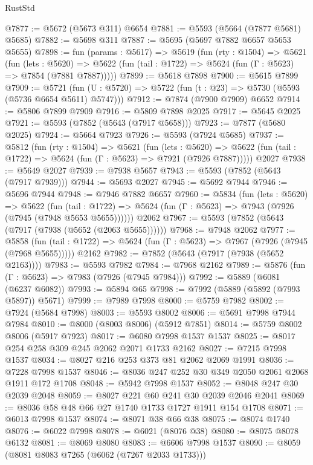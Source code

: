 \begin{lexlean}{RustStd}
\begin{coremodule}
@7877 := @5672 (@5673 @311) @6654
@7881 := @5593 (@5664 (@7877 @5681) @5685)
@7882 := @5698 @311
@7887 := @5695 (@5697 @7882 @6657 @5653 @5655)
@7898 := fun (params : @5617) =>
  @5619
    (fun (rty : @1504) =>
    @5621
      (fun (lets : @5620) =>
      @5622 (fun (tail : @1722) => @5624 (fun (Γ : @5623) => @7854 (@7881 @7887)))))
@7899 := @5618 @7898
@7900 := @5615 @7899
@7909 := @5721 (fun (U : @5720) => @5722 (fun (t : @23) => @5730 (@5593 (@5736 @6654 @5611) @5747)))
@7912 := @7874 (@7900 @7909) @6652
@7914 := @5806 @7899 @7909
@7916 := @5809 @7898 @2025
@7917 := @5645 @2025
@7921 := @5593 (@7852 (@5643 (@7917 @5658)))
@7923 := @7877 (@5680 @2025)
@7924 := @5664 @7923
@7926 := @5593 (@7924 @5685)
@7937 := @5812
    (fun (rty : @1504) =>
    @5621
      (fun (lets : @5620) =>
      @5622 (fun (tail : @1722) => @5624 (fun (Γ : @5623) => @7921 (@7926 @7887)))))
    @2027
@7938 := @5649 @2027
@7939 := @7938 @5657
@7943 := @5593 (@7852 (@5643 (@7917 @7939)))
@7944 := @5693 @2027
@7945 := @5692 @7944
@7946 := @5696 @7944
@7948 := @7946 @7882 @6657
@7960 := @5834
    (fun (lets : @5620) =>
    @5622
      (fun (tail : @1722) => @5624 (fun (Γ : @5623) => @7943 (@7926 (@7945 (@7948 @5653 @5655))))))
    @2062
@7967 := @5593 (@7852 (@5643 (@7917 (@7938 (@5652 (@2063 @5655))))))
@7968 := @7948 @2062
@7977 := @5858
    (fun (tail : @1722) => @5624 (fun (Γ : @5623) => @7967 (@7926 (@7945 (@7968 @5655)))))
    @2162
@7982 := @7852 (@5643 (@7917 (@7938 (@5652 @2163))))
@7983 := @5593 @7982
@7984 := @7968 @2162
@7989 := @5876 (fun (Γ : @5623) => @7983 (@7926 (@7945 @7984)))
@7992 := @5889 (@6081 (@6237 @6082))
@7993 := @5894 @65
@7998 := @7992 (@5889 (@5892 (@7993 @5897)) @5671)
@7999 := @7989 @7998
@8000 := @5759 @7982
@8002 := @7924 (@5684 @7998)
@8003 := @5593 @8002
@8006 := @5691 @7998 @7944 @7984
@8010 := @8000 (@8003 @8006) (@5912 @7851)
@8014 := @5759 @8002 @8006 (@5917 @7923)
@8017 := @6080 @7998 @1537 @1537
@8025 := @8017 @254 @258 @309 @245 @2062 @2071 @1733 @2162
@8027 := @7215 @7998 @1537
@8034 := @8027 @216 @253 @373 @81 @2062 @2069 @1991
@8036 := @7228 @7998 @1537
@8046 := @8036 @247 @252 @30 @349 @2050 @2061 @2068 @1911 @172 @1708
@8048 := @5942 @7998 @1537
@8052 := @8048 @247 @30 @2039 @2048
@8059 := @8027 @221 @60 @241 @30 @2039 @2046 @2041
@8069 := @8036 @58 @48 @66 @27 @1740 @1733 @1727 @1911 @154 @1708
@8071 := @6013 @7998 @1537
@8074 := @8071 @38 @66 @38
@8075 := @8074 @1740
@8076 := @6022 @7998
@8078 := @6021 (@8076 @38)
@8080 := @8075 @8078 @6132
@8081 := @8069 @8080
@8083 := @6606 @7998 @1537
@8090 := @8059 (@8081 @8083 @7265 (@6062 (@7267 @2033 @1733)))

\end{coremodule}
\end{lexlean}
